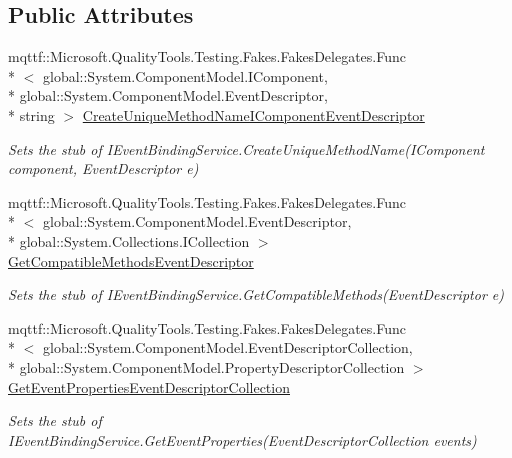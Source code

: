 \subsection*{Public Attributes}
\begin{DoxyCompactItemize}
\item 
mqttf\-::\-Microsoft.\-Quality\-Tools.\-Testing.\-Fakes.\-Fakes\-Delegates.\-Func\\*
$<$ global\-::\-System.\-Component\-Model.\-I\-Component, \\*
global\-::\-System.\-Component\-Model.\-Event\-Descriptor, \\*
string $>$ \hyperlink{class_system_1_1_component_model_1_1_design_1_1_fakes_1_1_stub_i_event_binding_service_a7e316675a07f17bef42c49d9b11aef01}{Create\-Unique\-Method\-Name\-I\-Component\-Event\-Descriptor}
\begin{DoxyCompactList}\small\item\em Sets the stub of I\-Event\-Binding\-Service.\-Create\-Unique\-Method\-Name(\-I\-Component component, Event\-Descriptor e)\end{DoxyCompactList}\item 
mqttf\-::\-Microsoft.\-Quality\-Tools.\-Testing.\-Fakes.\-Fakes\-Delegates.\-Func\\*
$<$ global\-::\-System.\-Component\-Model.\-Event\-Descriptor, \\*
global\-::\-System.\-Collections.\-I\-Collection $>$ \hyperlink{class_system_1_1_component_model_1_1_design_1_1_fakes_1_1_stub_i_event_binding_service_a0b7fb4a9cac4a0abed4e63407eb92cee}{Get\-Compatible\-Methods\-Event\-Descriptor}
\begin{DoxyCompactList}\small\item\em Sets the stub of I\-Event\-Binding\-Service.\-Get\-Compatible\-Methods(\-Event\-Descriptor e)\end{DoxyCompactList}\item 
mqttf\-::\-Microsoft.\-Quality\-Tools.\-Testing.\-Fakes.\-Fakes\-Delegates.\-Func\\*
$<$ global\-::\-System.\-Component\-Model.\-Event\-Descriptor\-Collection, \\*
global\-::\-System.\-Component\-Model.\-Property\-Descriptor\-Collection $>$ \hyperlink{class_system_1_1_component_model_1_1_design_1_1_fakes_1_1_stub_i_event_binding_service_a3b97bf594a2bfddec9c35cd68de5234c}{Get\-Event\-Properties\-Event\-Descriptor\-Collection}
\begin{DoxyCompactList}\small\item\em Sets the stub of I\-Event\-Binding\-Service.\-Get\-Event\-Properties(\-Event\-Descriptor\-Collection events)\end{DoxyCompactList}\item 

\end{DoxyCompactItemize}
